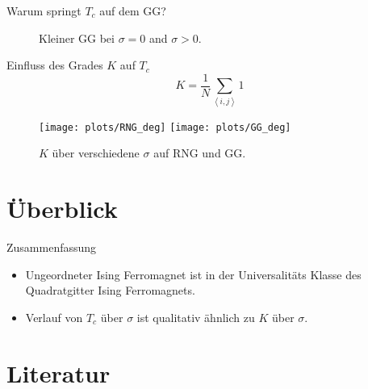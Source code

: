 \documentclass{beamer}
\newcommand{\avg}[1]{\left< #1 \right>}
\begin{document}
        \begin{frame}{Warum springt \(T_c\) auf dem GG?}
            \begin{figure}[htbp]
                \centering
                \subfigure{
                    \label{sfig:GGEdge:before}
                    \resizebox{0.43\textwidth}{!}{
                        
                    }
                }
                \subfigure{
                    \label{sfig:GGEdge:after}
                    \resizebox{0.43\textwidth}{!}{
                        
                    }
                }
                \caption
                {
                    Kleiner GG bei \(\sigma = 0\) and \(\sigma > 0\).
                }
                \label{fig:GGEdge}
            \end{figure}
        \end{frame}

        \begin{frame}{Einfluss des Grades \(K\) auf \(T_{c}\)}
            \begin{equation}
                K = \frac{1}{N} \sum_{\avg{i,j}} 1
                \label{eq:degree}
            \end{equation}
            \begin{figure}[htbp]
                \centering
                \subfigure
                {
                    \label{sfig:deg:RNG}
                    \texttt{[image: plots/RNG\_deg]}
                }
                \subfigure
                {
                    \label{sfig:deg:GG}
                    \texttt{[image: plots/GG\_deg]}
                }
                \caption
                {
                    \(K\) über verschiedene \(\sigma\) auf RNG und GG.
                }
                \label{fig:Tc_deg}
            \end{figure}
        \end{frame}

\section{Überblick}
    \begin{frame}{Zusammenfassung}
        \begin{itemize}[<+->]
            \item Ungeordneter Ising Ferromagnet ist in der Universalitäts Klasse des Quadratgitter Ising Ferromagnets.
            \item Verlauf von \(T_{c}\) über \(\sigma\) ist qualitativ ähnlich zu \(K\) über \(\sigma\).
        \end{itemize}
    \end{frame}

\section{Literatur}
    \begin{frame}[allowframebreaks]
        
        
    \end{frame}
\end{document}
